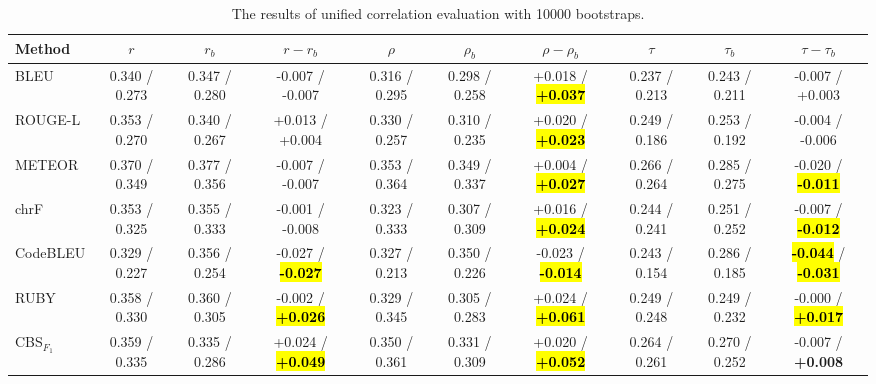 \begin{table}[t]
    \centering
    \scriptsize
    \setlength{\tabcolsep}{3.5pt}
    \caption{The results of unified correlation evaluation with 10000 bootstraps.}
    \label{tab:unified-settings}
    \begin{tabular}{@{}
        l|ccc|ccc|ccc@{}}
        \toprule
        Method & $r$ & $r_b$ & $r-r_b$ & $\rho$ & $\rho_b$ & $\rho-\rho_b$ & $\tau$ & $\tau_b$ & $\tau-\tau_b$ \\
        \midrule
        \midrule
        BLEU                    & 0.340 / 0.273   & 0.347 / 0.280   & -0.007 / -0.007                     & 0.316 / 0.295   & 0.298 / 0.258   & +0.018 / \hl{\textbf{+0.037}}       & 0.237 / 0.213   & 0.243 / 0.211   & -0.007 / +0.003                     \\
        ROUGE-L                 & 0.353 / 0.270   & 0.340 / 0.267   & +0.013 / +0.004                     & 0.330 / 0.257   & 0.310 / 0.235   & +0.020 / \hl{\textbf{+0.023}}       & 0.249 / 0.186   & 0.253 / 0.192   & -0.004 / -0.006                     \\
        METEOR                  & 0.370 / 0.349   & 0.377 / 0.356   & -0.007 / -0.007                     & 0.353 / 0.364   & 0.349 / 0.337   & +0.004 / \hl{\textbf{+0.027}}       & 0.266 / 0.264   & 0.285 / 0.275   & -0.020 / \hl{\textbf{-0.011}}       \\
        chrF                    & 0.353 / 0.325   & 0.355 / 0.333   & -0.001 / -0.008                     & 0.323 / 0.333   & 0.307 / 0.309   & +0.016 / \hl{\textbf{+0.024}}       & 0.244 / 0.241   & 0.251 / 0.252   & -0.007 / \hl{\textbf{-0.012}}       \\
        CodeBLEU                & 0.329 / 0.227   & 0.356 / 0.254   & -0.027 / \hl{\textbf{-0.027}}       & 0.327 / 0.213   & 0.350 / 0.226   & -0.023 / \hl{\textbf{-0.014}}       & 0.243 / 0.154   & 0.286 / 0.185   & \hl{\textbf{-0.044}} / \hl{\textbf{-0.031}} \\
        RUBY                    & 0.358 / 0.330   & 0.360 / 0.305   & -0.002 / \hl{\textbf{+0.026}}       & 0.329 / 0.345   & 0.305 / 0.283   & +0.024 / \hl{\textbf{+0.061}}       & 0.249 / 0.248   & 0.249 / 0.232   & -0.000 / \hl{\textbf{+0.017}}       \\
        CBS$_{F_1}$             & 0.359 / 0.335   & 0.335 / 0.286   & +0.024 / \hl{\textbf{+0.049}}       & 0.350 / 0.361   & 0.331 / 0.309   & +0.020 / \hl{\textbf{+0.052}}       & 0.264 / 0.261   & 0.270 / 0.252   & -0.007 / \textbf{+0.008}            \\

\end{tabular}
\end{table}
